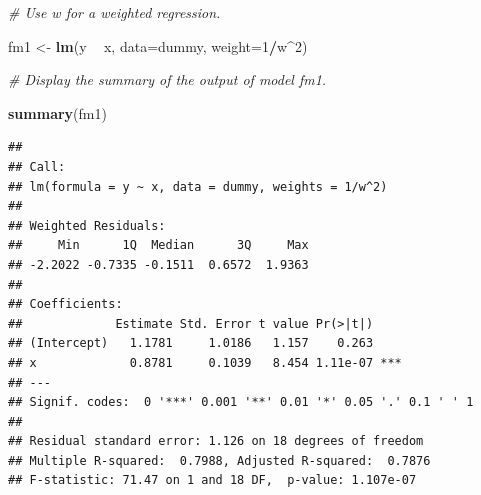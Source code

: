 \documentclass[]{book}
\newenvironment{Shaded}{\begin{snugshade}}{\end{snugshade}}
\newcommand{\CommentTok}[1]{\textcolor[rgb]{0.56,0.35,0.01}{\textit{#1}}}
\newcommand{\DataTypeTok}[1]{\textcolor[rgb]{0.13,0.29,0.53}{#1}}
\newcommand{\DecValTok}[1]{\textcolor[rgb]{0.00,0.00,0.81}{#1}}
\newcommand{\KeywordTok}[1]{\textcolor[rgb]{0.13,0.29,0.53}{\textbf{#1}}}
\newcommand{\NormalTok}[1]{#1}
\newcommand{\OperatorTok}[1]{\textcolor[rgb]{0.81,0.36,0.00}{\textbf{#1}}}
\newcommand{\StringTok}[1]{\textcolor[rgb]{0.31,0.60,0.02}{#1}}
\begin{document}
\begin{Shaded}
\begin{Highlighting}[]
\CommentTok{# Use w for a weighted regression.}

\NormalTok{fm1 <-}\StringTok{ }\KeywordTok{lm}\NormalTok{(y }\OperatorTok{~}\StringTok{ }\NormalTok{x, }\DataTypeTok{data=}\NormalTok{dummy, }\DataTypeTok{weight=}\DecValTok{1}\OperatorTok{/}\NormalTok{w}\OperatorTok{^}\DecValTok{2}\NormalTok{) }

\CommentTok{# Display the summary of the output of model fm1.}

\KeywordTok{summary}\NormalTok{(fm1)}
\end{Highlighting}
\end{Shaded}

\begin{verbatim}
## 
## Call:
## lm(formula = y ~ x, data = dummy, weights = 1/w^2)
## 
## Weighted Residuals:
##     Min      1Q  Median      3Q     Max 
## -2.2022 -0.7335 -0.1511  0.6572  1.9363 
## 
## Coefficients:
##             Estimate Std. Error t value Pr(>|t|)    
## (Intercept)   1.1781     1.0186   1.157    0.263    
## x             0.8781     0.1039   8.454 1.11e-07 ***
## ---
## Signif. codes:  0 '***' 0.001 '**' 0.01 '*' 0.05 '.' 0.1 ' ' 1
## 
## Residual standard error: 1.126 on 18 degrees of freedom
## Multiple R-squared:  0.7988, Adjusted R-squared:  0.7876 
## F-statistic: 71.47 on 1 and 18 DF,  p-value: 1.107e-07
\end{verbatim}

\begin{Shaded}
\end{Shaded}
\end{document}
